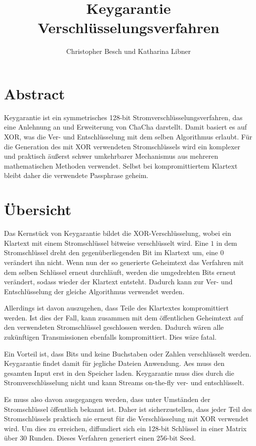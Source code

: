 \documentclass[10pt,a4paper]{article}
\author{Christopher Besch und Katharina Libner}
\title{Keygarantie Verschlüsselungsverfahren}
\begin{document}
\maketitle
\tableofcontents
\newpage

\section{Abstract}

Keygarantie ist ein symmetrisches 128-bit Stromverschlüsselungsverfahren, das eine Anlehnung an und Erweiterung von ChaCha darstellt\cite{Bernstein2008}.
Damit basiert es auf XOR, was die Ver- und Entschlüsselung mit dem selben Algorithmus erlaubt.
Für die Generation des mit XOR verwendeten Stromschlüssels wird ein komplexer und praktisch äußerst schwer umkehrbarer Mechanismus aus mehreren mathematischen Methoden verwendet.
Selbst bei kompromittiertem Klartext bleibt daher die verwendete Passphrase geheim.

\section{Übersicht}

Das Kernstück von Keygarantie bildet die XOR-Verschlüsselung, wobei ein Klartext mit einem Stromschlüssel bitweise verschlüsselt wird.
Eine $1$ in dem Stromschlüssel dreht den gegenüberliegenden Bit im Klartext um, eine $0$ verändert ihn nicht.
Wenn nun der so generierte Geheimtext das Verfahren mit dem selben Schlüssel erneut durchläuft, werden die umgedrehten Bits erneut verändert, sodass wieder der Klartext entsteht.
Dadurch kann zur Ver- und Entschlüsselung der gleiche Algorithmus verwendet werden.

Allerdings ist davon auszugehen, dass Teile des Klartextes kompromittiert werden.
Ist dies der Fall, kann zusammen mit dem öffentlichen Geheimtext auf den verwendeten Stromschlüssel geschlossen werden.
Dadurch wären alle zukünftigen Transmissionen ebenfalls kompromittiert.
Dies wäre fatal.

Ein Vorteil ist, dass Bits und keine Buchstaben oder Zahlen verschlüsselt werden.
Keygarantie findet damit für jegliche Dateien Anwendung.
Aes muss den gesamten Input erst in den Speicher laden\cite{Pitchaiah2012}.
Keygarantie muss dies durch die Stromverschlüsselung nicht und kann Streams on-the-fly ver- und entschlüsselt.

\medskip
Es muss also davon ausgegangen werden, dass unter Umständen der Stromschlüssel öffentlich bekannt ist.
Daher ist sicherzustellen, dass jeder Teil des Stromschlüssels praktisch nie erneut für die Verschlüsselung mit XOR verwendet wird.
Um dies zu erreichen, diffundiert sich ein 128-bit Schlüssel in einer Matrix über 30 Runden.
Dieses Verfahren generiert einen 256-bit Seed.
\end{document}
